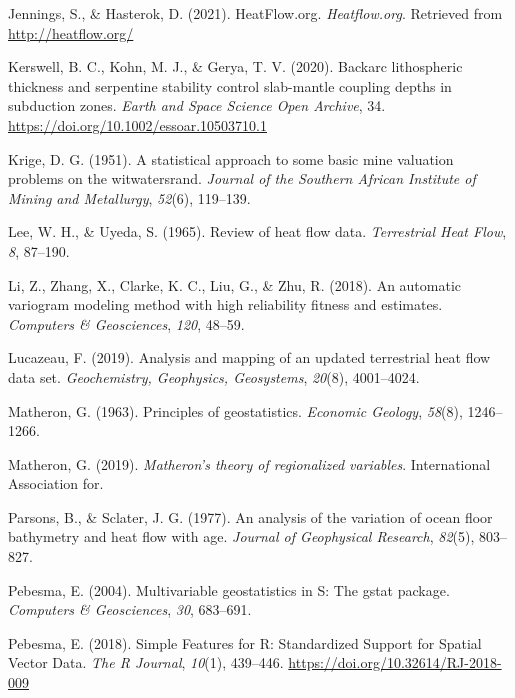 \documentclass[draft,linenumbers]{agujournal2018}
\newlength{\cslhangindent}
\newenvironment{CSLReferences}[3] %
 {%
  \setlength{\parindent}{0pt}
  \ifodd #1 \everypar{\setlength{\hangindent}{\cslhangindent}}\ignorespaces\fi
  \ifnum #2 > 0
  \setlength{\parskip}{#2\baselineskip}
  \fi
 }%
 {}
\begin{document}
\begin{CSLReferences}{1}{0}
\leavevmode{}%
Jennings, S., \& Hasterok, D. (2021). HeatFlow.org. \emph{Heatflow.org}.
Retrieved from \url{http://heatflow.org/}

\leavevmode{}%
Kerswell, B. C., Kohn, M. J., \& Gerya, T. V. (2020). Backarc
lithospheric thickness and serpentine stability control slab-mantle
coupling depths in subduction zones. \emph{Earth and Space Science Open
Archive}, 34. \url{https://doi.org/10.1002/essoar.10503710.1}

\leavevmode{}%
Krige, D. G. (1951). A statistical approach to some basic mine valuation
problems on the witwatersrand. \emph{Journal of the Southern African
Institute of Mining and Metallurgy}, \emph{52}(6), 119--139.

\leavevmode{}%
Lee, W. H., \& Uyeda, S. (1965). Review of heat flow data.
\emph{Terrestrial Heat Flow}, \emph{8}, 87--190.

\leavevmode{}%
Li, Z., Zhang, X., Clarke, K. C., Liu, G., \& Zhu, R. (2018). An
automatic variogram modeling method with high reliability fitness and
estimates. \emph{Computers \& Geosciences}, \emph{120}, 48--59.

\leavevmode{}%
Lucazeau, F. (2019). Analysis and mapping of an updated terrestrial heat
flow data set. \emph{Geochemistry, Geophysics, Geosystems},
\emph{20}(8), 4001--4024.

\leavevmode{}%
Matheron, G. (1963). Principles of geostatistics. \emph{Economic
Geology}, \emph{58}(8), 1246--1266.

\leavevmode{}%
Matheron, G. (2019). \emph{Matheron's theory of regionalized variables}.
International Association for.

\leavevmode{}%
Parsons, B., \& Sclater, J. G. (1977). An analysis of the variation of
ocean floor bathymetry and heat flow with age. \emph{Journal of
Geophysical Research}, \emph{82}(5), 803--827.

\leavevmode{}%
Pebesma, E. (2004). Multivariable geostatistics in {S}: The gstat
package. \emph{Computers \& Geosciences}, \emph{30}, 683--691.

\leavevmode{}%
Pebesma, E. (2018). {Simple Features for R: Standardized Support for
Spatial Vector Data}. \emph{{The R Journal}}, \emph{10}(1), 439--446.
\url{https://doi.org/10.32614/RJ-2018-009}


\end{CSLReferences}
\end{document}
